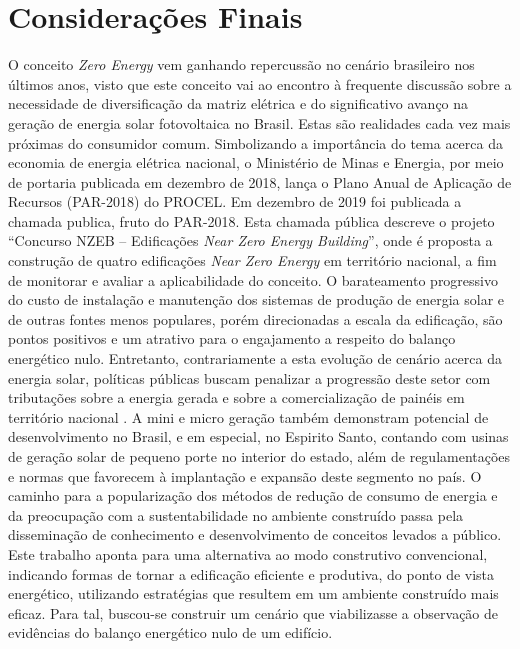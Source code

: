 \section{Considerações Finais}
\noindent O conceito \textit{Zero Energy} vem ganhando repercussão no cenário brasileiro nos últimos anos, visto que este conceito vai ao encontro à frequente discussão sobre a necessidade de diversificação da matriz elétrica e do significativo avanço na geração de energia solar fotovoltaica no Brasil. Estas são realidades cada vez mais próximas do consumidor comum. Simbolizando a importância do tema acerca da economia de energia elétrica nacional, o Ministério de Minas e Energia, por meio de portaria publicada em dezembro de 2018, lança o Plano Anual de Aplicação de Recursos (PAR-2018) do PROCEL. Em dezembro de 2019 foi publicada a chamada publica, fruto do PAR-2018. Esta chamada pública descreve o projeto “Concurso NZEB – Edificações \textit{Near Zero Energy Building}”, onde é proposta a construção de quatro edificações \textit{Near Zero Energy} em território nacional, a fim de monitorar e avaliar a aplicabilidade do conceito.\vspace*{0.3cm} \newline
\noindent O barateamento progressivo do custo de instalação e manutenção dos sistemas de produção de energia solar e de outras fontes menos populares, porém direcionadas a escala da edificação, são pontos positivos e um atrativo para o engajamento a respeito do balanço energético nulo. Entretanto, contrariamente a esta evolução de cenário acerca da energia solar, políticas públicas buscam penalizar a progressão deste setor com tributações sobre a energia gerada e sobre a comercialização de painéis em território nacional \cite{Warth2019a,Warth2019}. A mini e micro geração também demonstram potencial de desenvolvimento no Brasil, e em especial, no Espirito Santo, contando com usinas de geração solar de pequeno porte no interior do estado, além de regulamentações e normas que favorecem à implantação e expansão deste segmento no país.\vspace*{0.3cm} \newline
\noindent O caminho para a popularização dos métodos de redução de consumo de energia e da preocupação com a sustentabilidade no ambiente construído passa pela disseminação de conhecimento e desenvolvimento de conceitos levados a público.\vspace*{0.3cm} \newline
\noindent Este trabalho aponta para uma alternativa ao modo construtivo convencional, indicando formas de tornar a edificação eficiente e produtiva, do ponto de vista energético, utilizando estratégias que resultem em um ambiente construído mais eficaz. Para tal, buscou-se construir um cenário que viabilizasse a observação de evidências do balanço energético nulo de um edifício.\vspace*{0.3cm} \newline
